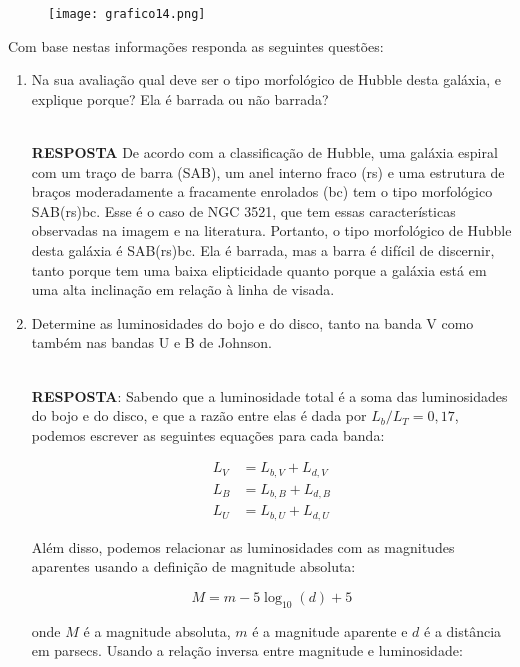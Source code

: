 \documentclass[a4paper,12pt]{article}
\begin{document}
\begin{enumerate}
\begin{figure}[H]
\centering
\texttt{[image: grafico14.png]}
\end{figure}

Com base nestas informações responda as seguintes questões:

\begin{enumerate}
\item Na sua avaliação qual deve ser o tipo morfológico de Hubble desta galáxia, e explique porque? Ela é barrada ou não barrada?

\noindent\hrulefill\\\textbf{RESPOSTA} De acordo com a classificação de Hubble, uma galáxia espiral com um traço de barra (SAB), um anel interno fraco (rs) e uma estrutura de braços moderadamente a fracamente enrolados (bc) tem o tipo morfológico SAB(rs)bc. Esse é o caso de NGC 3521, que tem essas características observadas na imagem e na literatura. Portanto, o tipo morfológico de Hubble desta galáxia é SAB(rs)bc. Ela é barrada, mas a barra é difícil de discernir, tanto porque tem uma baixa elipticidade quanto porque a galáxia está em uma alta inclinação em relação à linha de visada.

\noindent\hrulefill
    
\item Determine as luminosidades do bojo e do disco, tanto na banda V como também nas bandas U e B de Johnson.
    
\noindent\hrulefill\\\textbf{RESPOSTA}: Sabendo que a luminosidade total é a soma das luminosidades do bojo e do disco, e que a razão entre elas é dada por $L_b/L_T=0,17$, podemos escrever as seguintes equações para cada banda:

\begin{align*}
L_V &= L_{b,V} + L_{d,V} \\
L_B &= L_{b,B} + L_{d,B} \\
L_U &= L_{b,U} + L_{d,U}
\end{align*}

Além disso, podemos relacionar as luminosidades com as magnitudes aparentes usando a definição de magnitude absoluta:

\begin{equation*}
M = m - 5\log_{10}(d) + 5
\end{equation*}

onde $M$ é a magnitude absoluta, $m$ é a magnitude aparente e $d$ é a distância em parsecs. Usando a relação inversa entre magnitude e luminosidade:


\end{enumerate}
\end{enumerate}
\end{document}
